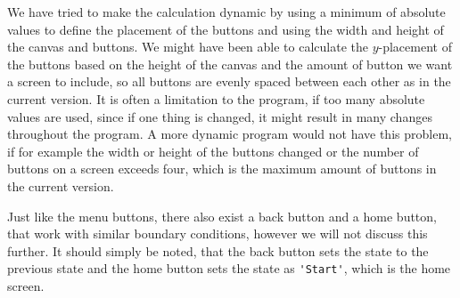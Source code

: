We have tried to make the calculation dynamic by using a minimum of absolute values to define the placement of the buttons and using the width and height of the canvas and buttons. We might have been able to calculate the $y$-placement of the buttons based on the height of the canvas and the amount of button we want a screen to include, so all buttons are evenly spaced between each other as in the current version. It is often a limitation to the program, if too many absolute values are used, since if one thing is changed, it might result in many changes throughout the program. A more dynamic program would not have this problem, if for example the width or height of the buttons changed or the number of buttons on a screen exceeds four, which is the maximum amount of buttons in the current version.

Just like the menu buttons, there also exist a back button and a home button, that work with similar boundary conditions, however we will not discuss this further. It should simply be noted, that the back button sets the state to the previous state and the home button sets the state as \verb|'Start'|, which is the home screen.